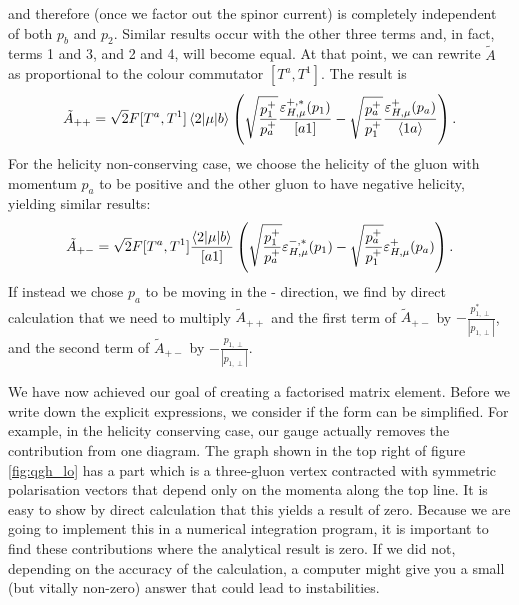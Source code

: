 and therefore (once we factor out the spinor current) is completely independent of both $p_b$ and $p_2$. Similar results occur with the other three terms and, in fact, terms 1 and 3, and 2 and 4, will become equal. At that point, we can rewrite $\tilde{A}$ as proportional to the colour commutator $[T^a,T^1]$. The result is
\begin{equation}
\tilde{A}_{++} = \sqrt{2} F [T^a,T^1] \mathinner{\langle2\vert\mu\vert b\rangle}_{} \left(\sqrt{\frac{p_1^+}{p_a^+}}\frac{\varepsilon_{H,\mu}^{+,*}(p_1)}{[a1]} - \sqrt{\frac{p_a^+}{p_1^+}}\frac{\varepsilon_{H,\mu}^{+}(p_a)}{ \left<1 a \right>} \right).
\end{equation}
For the helicity non-conserving case, we choose the helicity of the gluon with momentum $p_a$ to be positive and the other gluon to have negative helicity, yielding similar results:
\begin{equation}
\tilde{A}_{+-} = \sqrt{2} F [T^a,T^1] \frac{\mathinner{\langle2\vert\mu\vert b\rangle}_{}}{[a1]} \left(\sqrt{\frac{p_1^+}{p_a^+}}\varepsilon_{H,\mu}^{-,*}(p_1) - \sqrt{\frac{p_a^+}{p_1^+}}\varepsilon_{H,\mu}^{+}(p_a) \right).
\end{equation}
If instead we chose $p_a$ to be moving in the - direction, we find by direct calculation that we need to multiply $\tilde{A}_{++}$ and the first term of $\tilde{A}_{+-}$ by $-\frac{p_{1,\perp}^*}{|p_{1,\perp}|}$, and the second term of $\tilde{A}_{+-}$ by $-\frac{p_{1,\perp}}{|p_{1,\perp}|}$. 

We have now achieved our goal of creating a factorised matrix element. Before we write down the explicit expressions, we consider if the form can be simplified. For example, in the helicity conserving case, our gauge actually removes the contribution from one diagram. The graph shown in the top right of figure \ref{fig:qgh_lo} has a part which is a three-gluon vertex contracted with symmetric polarisation vectors that depend only on the momenta along the top line. It is easy to show by direct calculation that this yields a result of zero. Because we are going to implement this in a numerical integration program, it is important to find these contributions where the analytical result is zero. If we did not, depending on the accuracy of the calculation, a computer might give you a small (but vitally non-zero) answer that could lead to instabilities.

